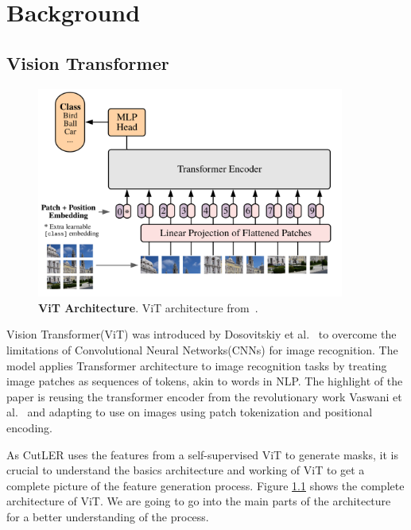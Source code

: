 \chapter{Background}\label{chap:background}

\section{Vision Transformer}

\begin{figure}
	\centering
	\includegraphics[width=0.9\textwidth]{Images/main/vit_full_arch.png}
	\caption[\textbf{ViT Architecture}]{\textbf{ViT Architecture}. ViT architecture from~\cite{dosovitskiy2020image}.}
	\label{fig:vit_full_arch}
\end{figure}

Vision Transformer(ViT) was introduced by Dosovitskiy et al.~\cite{dosovitskiy2020image} to overcome the limitations of Convolutional Neural Networks(CNNs) for image recognition. The model applies Transformer architecture to image recognition tasks by treating image patches as sequences of tokens, akin to words in NLP. The highlight of the paper is reusing the transformer encoder from the revolutionary work Vaswani et al.~\cite{vaswani2023attentionneed} and adapting to use on images using patch tokenization and positional encoding.

As CutLER uses the features from a self-supervised ViT to generate masks, it is crucial to understand the basics architecture and working of ViT to get a complete picture of the feature generation process. Figure \ref{fig:vit_full_arch} shows the complete architecture of ViT. We are going to go into the main parts of the architecture for a better understanding of the process.

